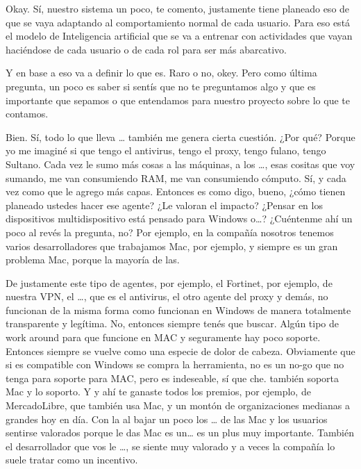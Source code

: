 \begin{description}[leftmargin=0cm, labelsep=0.5cm]
    \item[\textbf{MOCIULSKY SANTIAGO:}] Okay. Sí, nuestro sistema un poco, te comento, justamente tiene planeado eso de que se vaya adaptando al comportamiento normal de cada usuario. Para eso está el modelo de Inteligencia artificial que se va a entrenar con actividades que vayan haciéndose de cada usuario o de cada rol para ser más abarcativo.

    \item[\textbf{MOCIULSKY SANTIAGO:}] Y en base a eso va a definir lo que es. Raro o no, okey. Pero como última pregunta, un poco es saber si sentís que no te preguntamos algo y que es importante que sepamos o que entendamos para nuestro proyecto sobre lo que te contamos.

    \item[\textbf{PEÑA ALEJANDRO FRANCISCO:}] Bien. Sí, todo lo que lleva … también me genera cierta cuestión. ¿Por qué? Porque yo me imaginé si que tengo el antivirus, tengo el proxy, tengo fulano, tengo Sultano. Cada vez le sumo más cosas a las máquinas, a los …, esas cositas que voy sumando, me van consumiendo RAM, me van consumiendo cómputo. Sí, y cada vez como que le agrego más capas. Entonces es como digo, bueno, ¿cómo tienen planeado ustedes hacer ese agente? ¿Le valoran el impacto? ¿Pensar en los dispositivos multidispositivo está pensado para Windows o…? ¿Cuéntenme ahí un poco al revés la pregunta, no? Por ejemplo, en la compañía nosotros tenemos varios desarrolladores que trabajamos Mac, por ejemplo, y siempre es un gran problema Mac, porque la mayoría de las.

    \item[\textbf{PEÑA ALEJANDRO FRANCISCO:}] De justamente este tipo de agentes, por ejemplo, el Fortinet, por ejemplo, de nuestra VPN, el …, que es el antivirus, el otro agente del proxy y demás, no funcionan de la misma forma como funcionan en Windows de manera totalmente transparente y legítima. No, entonces siempre tenés que buscar. Algún tipo de work around para que funcione en MAC y seguramente hay poco soporte. Entonces siempre se vuelve como una especie de dolor de cabeza. Obviamente que si es compatible con Windows se compra la herramienta, no es un no-go que no tenga para soporte para MAC, pero es indeseable, sí que che. también soporta Mac y lo soporto. Y y ahí te ganaste todos los premios, por ejemplo, de MercadoLibre, que también usa Mac, y un montón de organizaciones medianas a grandes hoy en día. Con la al bajar un poco los … de las Mac y los usuarios sentirse valorados porque le das Mac es un… es un plus muy importante. También el desarrollador que vos le …, se siente muy valorado y a veces la compañía lo suele tratar como un incentivo.


\end{description}
